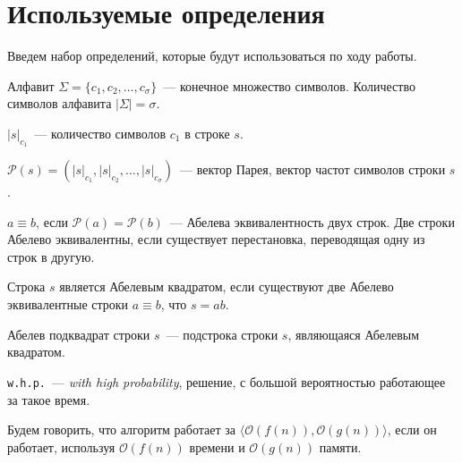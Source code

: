 \section{Используемые определения}

Введем набор определений, которые будут использоваться по ходу работы. 

\begin{definition}
Алфавит $\Sigma=\{c_1, c_2, \ldots, c_\sigma\}$~--- конечное множество символов. Количество символов алфавита $|\Sigma|=\sigma$.
\end{definition}

\begin{definition}
$|s|_{c_1}$~--- количество символов $c_1$ в строке $s$.
\end{definition}


\begin{definition}
$\mathcal{P}(s)=(|s|_{c_1}, |s|_{c_2}, \ldots, |s|_{c_\sigma})$~--- вектор Парея, вектор частот символов строки $s$.
\end{definition}

\begin{definition}
$a \equiv b$, если $\mathcal{P}(a) = \mathcal{P}(b)$~--- Абелева эквивалентность двух строк. Две строки Абелево эквивалентны, если существует перестановка, переводящая одну из строк в другую.
\end{definition}

\begin{definition}
Строка $s$ является Абелевым квадратом, если существуют две Абелево эквивалентные строки $a \equiv b$, что $s = ab$.
\end{definition}

\begin{definition}
Абелев подквадрат строки $s$~--- подстрока строки $s$, являющаяся Абелевым квадратом.
\end{definition}

\begin{definition}
\texttt{w.h.p.}~--- \textit{with high probability}, решение, с большой вероятностью работающее за такое время.
\end{definition}

\begin{definition}
Будем говорить, что алгоритм работает за $\langle \mathcal{O}(f(n)), \mathcal{O}(g(n)) \rangle$, если он работает, используя $\mathcal{O}(f(n))$ времени и  $\mathcal{O}(g(n))$ памяти.
\end{definition}

